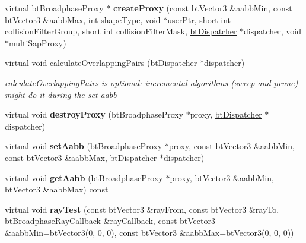 \begin{DoxyCompactItemize}
\item 
\mbox{\label{classbtSimpleBroadphase_a7e6c608def100940dac44f0566e0dfae}} 
virtual bt\+Broadphase\+Proxy $\ast$ {\bfseries create\+Proxy} (const bt\+Vector3 \&aabb\+Min, const bt\+Vector3 \&aabb\+Max, int shape\+Type, void $\ast$user\+Ptr, short int collision\+Filter\+Group, short int collision\+Filter\+Mask, \hyperlink{classbtDispatcher}{bt\+Dispatcher} $\ast$dispatcher, void $\ast$multi\+Sap\+Proxy)
\item 
\mbox{\label{classbtSimpleBroadphase_ae1480dafc61198eb9651a755acd6024d}} 
virtual void \hyperlink{classbtSimpleBroadphase_ae1480dafc61198eb9651a755acd6024d}{calculate\+Overlapping\+Pairs} (\hyperlink{classbtDispatcher}{bt\+Dispatcher} $\ast$dispatcher)
\begin{DoxyCompactList}\small\item\em calculate\+Overlapping\+Pairs is optional\+: incremental algorithms (sweep and prune) might do it during the set aabb \end{DoxyCompactList}\item 
\mbox{\label{classbtSimpleBroadphase_a6a9ad7d177c14928219abe8922523644}} 
virtual void {\bfseries destroy\+Proxy} (bt\+Broadphase\+Proxy $\ast$proxy, \hyperlink{classbtDispatcher}{bt\+Dispatcher} $\ast$dispatcher)
\item 
\mbox{\label{classbtSimpleBroadphase_a0a3768f318903746eb9e65573f95b61c}} 
virtual void {\bfseries set\+Aabb} (bt\+Broadphase\+Proxy $\ast$proxy, const bt\+Vector3 \&aabb\+Min, const bt\+Vector3 \&aabb\+Max, \hyperlink{classbtDispatcher}{bt\+Dispatcher} $\ast$dispatcher)
\item 
\mbox{\label{classbtSimpleBroadphase_a2808d0e76f5b7f5a423ab1714c37d1af}} 
virtual void {\bfseries get\+Aabb} (bt\+Broadphase\+Proxy $\ast$proxy, bt\+Vector3 \&aabb\+Min, bt\+Vector3 \&aabb\+Max) const
\item 
\mbox{\label{classbtSimpleBroadphase_a740b389cb2cbcbe273c217283bd14295}} 
virtual void {\bfseries ray\+Test} (const bt\+Vector3 \&ray\+From, const bt\+Vector3 \&ray\+To, \hyperlink{structbtBroadphaseRayCallback}{bt\+Broadphase\+Ray\+Callback} \&ray\+Callback, const bt\+Vector3 \&aabb\+Min=bt\+Vector3(0, 0, 0), const bt\+Vector3 \&aabb\+Max=bt\+Vector3(0, 0, 0))

\end{DoxyCompactItemize}
